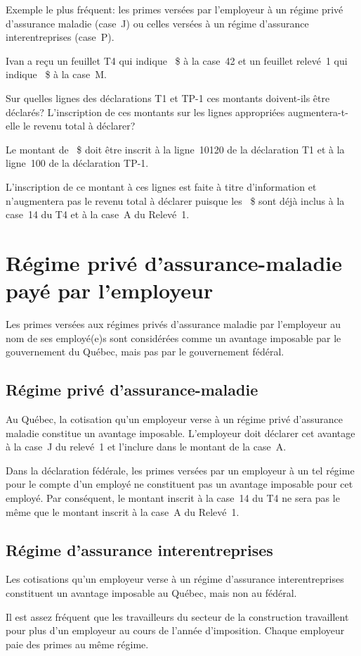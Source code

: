 Exemple le plus fréquent: les primes versées par l'employeur à un régime privé d'assurance maladie (case~J) ou celles versées à un régime d'assurance interentreprises (case~P).

\begin{question}
	Ivan a reçu un feuillet T4 qui indique ~\$ à la case~42 et un feuillet relevé~1 qui indique ~\$ à la case~M. 
	
	Sur quelles lignes des déclarations T1 et TP-1 ces montants doivent-ils être déclarés? L'inscription de ces montants sur les lignes appropriées augmentera-t-elle le revenu total à déclarer?
\end{question}
Le montant de ~\$ doit être inscrit à la ligne~10120 de la déclaration T1 et à la ligne~100 de la déclaration TP-1.

L'inscription de ce montant à ces lignes est faite à titre d'information et n'augmentera pas le revenu total à déclarer puisque les ~\$ sont déjà inclus à la case~14 du T4 et à la case~A du Relevé~1.



\section{Régime privé d'assurance-maladie payé par l'employeur}
\begin{intro}
	Les primes versées aux régimes privés d'assurance maladie par l'employeur au nom de ses employé(e)s sont considérées comme un avantage imposable par le gouvernement du Québec, mais pas par le gouvernement fédéral.
\end{intro}


\subsection{Régime privé d'assurance-maladie}
Au Québec, la cotisation qu'un employeur verse à un régime privé d'assurance maladie constitue un avantage imposable. L'employeur doit déclarer cet avantage à la case~J du relevé~1 et l'inclure dans le montant de la case~A. 

Dans la déclaration fédérale, les primes versées par un employeur à un tel régime pour le compte d'un employé ne constituent pas un avantage imposable pour cet employé. Par conséquent, le montant inscrit à la case~14 du T4 ne sera pas le même que le montant inscrit à la case~A du Relevé~1.


\subsection{Régime d'assurance interentreprises}
Les cotisations qu'un employeur verse à un régime d'assurance interentreprises constituent un avantage imposable au Québec, mais non au fédéral.
\begin{note}
	Il est assez fréquent que les travailleurs du secteur de la construction travaillent pour plus d'un employeur au cours de l'année d'imposition. Chaque employeur paie des primes au même régime.
\end{note}


